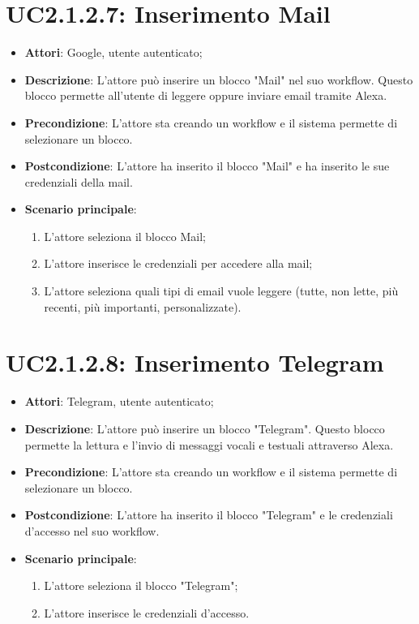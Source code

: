 \section{UC2.1.2.7: Inserimento Mail}
\label{UC2.1.2.7}
\begin{itemize}
	\item \textbf{Attori}: Google, utente autenticato;
	\item \textbf{Descrizione}: L'attore può inserire un blocco "Mail" nel suo workflow. Questo blocco permette all'utente di leggere oppure inviare email tramite Alexa.
	\item \textbf{Precondizione}: L'attore sta creando un workflow e il sistema permette di selezionare un blocco.
	\item \textbf{Postcondizione}: L'attore ha inserito il blocco "Mail" e ha inserito le sue credenziali della mail.
	\item \textbf{Scenario principale}:
	\begin{enumerate} \item L'attore seleziona il blocco Mail;  \item  L'attore inserisce le credenziali per accedere alla mail;  \item  L'attore seleziona quali tipi di email vuole leggere (tutte, non lette, più recenti, più importanti, personalizzate).\end{enumerate}
\end{itemize}

\section{UC2.1.2.8: Inserimento Telegram}
\label{UC2.1.2.8}
\begin{itemize}
	\item \textbf{Attori}: Telegram, utente autenticato;
	\item \textbf{Descrizione}: L'attore può inserire un blocco "Telegram". Questo blocco permette la lettura e l'invio di messaggi vocali e testuali attraverso Alexa.
	\item \textbf{Precondizione}: L'attore sta creando un workflow e il sistema permette di selezionare un blocco.
	\item \textbf{Postcondizione}: L'attore ha inserito il blocco "Telegram" e le credenziali d'accesso nel suo workflow.
	\item \textbf{Scenario principale}:
	\begin{enumerate} \item L'attore seleziona il blocco "Telegram";  \item  L'attore inserisce le credenziali d'accesso.\end{enumerate}
\end{itemize}

